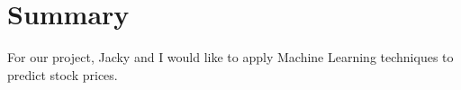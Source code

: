 \documentclass{article}
\begin{document}
\section{Summary}
For our project, Jacky and I would like to apply Machine Learning
techniques to predict stock prices.
\end{document}
